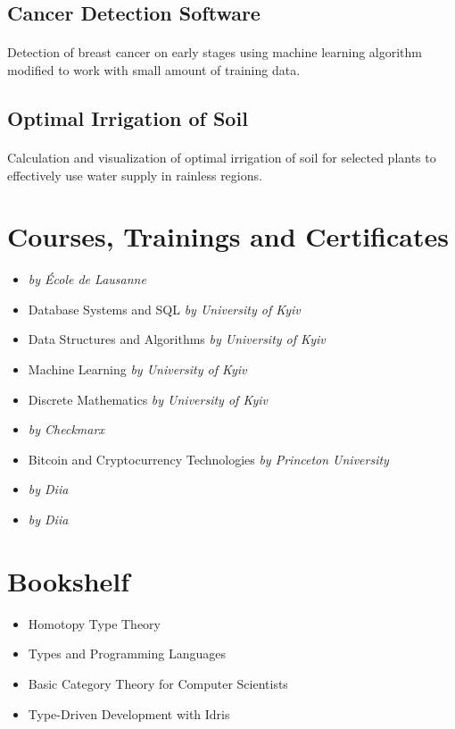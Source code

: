 \subsection{Cancer Detection Software}
\paragraph{}
Detection of breast cancer on early stages using machine learning algorithm modified to work with small amount of training data.

\subsection{Optimal Irrigation of Soil}
\paragraph{}
Calculation and visualization of optimal irrigation of soil for selected plants to effectively use water supply in rainless regions.

\section{Courses, Trainings and Certificates}
\begin{itemize}
  \item {} \textit{by École de Lausanne}
  \item Database Systems and SQL \textit{by University of Kyiv}
  \item Data Structures and Algorithms \textit{by University of Kyiv}
  \item Machine Learning \textit{by University of Kyiv}
  \item Discrete Mathematics \textit{by University of Kyiv}
  \item {} \textit{by Checkmarx}
  \item Bitcoin and Cryptocurrency Technologies \textit{by Princeton University}
  \item {} \textit{by Diia}
  \item {} \textit{by Diia}
\end{itemize}

\section{Bookshelf}
\begin{itemize}
  \item Homotopy Type Theory
  \item Types and Programming Languages
  \item Basic Category Theory for Computer Scientists
  \item Type-Driven Development with Idris
\end{itemize}

